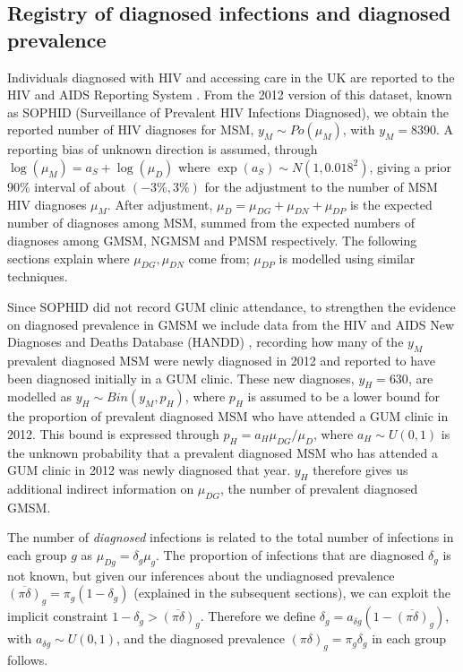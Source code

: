 \documentclass[12pt]{article}\usepackage[]{graphicx}\usepackage[]{color}
\newcommand{\pinodelta}{\overline{(\pi\delta)}}
\newcommand{\pidelta}{(\pi\delta)}
\begin{document}
\subsection{Registry of diagnosed infections and diagnosed prevalence}
Individuals diagnosed with HIV and accessing care in the UK are
reported to the HIV and AIDS Reporting System
\citep{PHEreport2016}.  From the 2012 version of this dataset, known
as SOPHID (Surveillance of Prevalent HIV Infections Diagnosed),
we obtain the reported number of HIV diagnoses for MSM, $y_M \sim
Po(\mu_M)$, with $y_M=8390$. A reporting bias
of unknown direction is assumed, through $\log(\mu_M) = a_S + \log(\mu_D)$ where
$\exp(a_S) \sim N(1,0.018^2)$, giving a prior $90\%$ interval of about
$(-3\%,3\%)$ for the adjustment to the number of MSM HIV diagnoses
$\mu_M$.  After adjustment, $\mu_{D} = \mu_{DG} + \mu_{DN} + \mu_{DP}$
is the expected number of diagnoses among MSM, summed from the
expected numbers of diagnoses among GMSM, NGMSM and PMSM respectively.
The following sections explain where $\mu_{DG},\mu_{DN}$ come from;
$\mu_{DP}$ is modelled using similar techniques.

Since SOPHID did not record GUM clinic attendance, to strengthen the evidence on diagnosed prevalence in GMSM we include data from the HIV and AIDS New Diagnoses and Deaths Database (HANDD) \citep{PHEreport2016}, recording how many of the $y_{M}$ prevalent diagnosed MSM were newly diagnosed in 2012 and reported to have been diagnosed initially in a GUM clinic. These new diagnoses, $y_{H}=630$, are modelled as $y_{H} \sim Bin(y_{M}, p_{H})$, where $p_H$ is assumed to be a lower bound for the proportion of prevalent diagnosed MSM who have attended a GUM clinic in 2012. This bound is expressed through $p_{H} = a_H \mu_{DG} / \mu_{D}$, where $a_H \sim U(0,1)$ is the unknown probability that a prevalent diagnosed MSM who has attended a GUM clinic in 2012 was newly diagnosed that year. $y_H$ therefore gives us additional indirect information on $\mu_{DG}$, the number of prevalent diagnosed GMSM.

The number of \emph{diagnosed} infections is related to the total
number of infections in each group $g$ as $\mu_{Dg} = \delta_g
\mu_{g}$.  The proportion of infections that are diagnosed $\delta_g$
is not known, but given our inferences about the undiagnosed
prevalence $\pinodelta_g = \pi_g(1 - \delta_g)$ (explained in the
subsequent sections), we can exploit the implicit constraint $1 -
\delta_g > \pinodelta_g$.  Therefore we define $\delta_g = a_{\delta
  g}(1 - \pinodelta_g)$, with $a_{\delta g} \sim U(0,1)$, and the
diagnosed prevalence $\pidelta_g = \pi_g\delta_g$ in each group follows.
\end{document}
